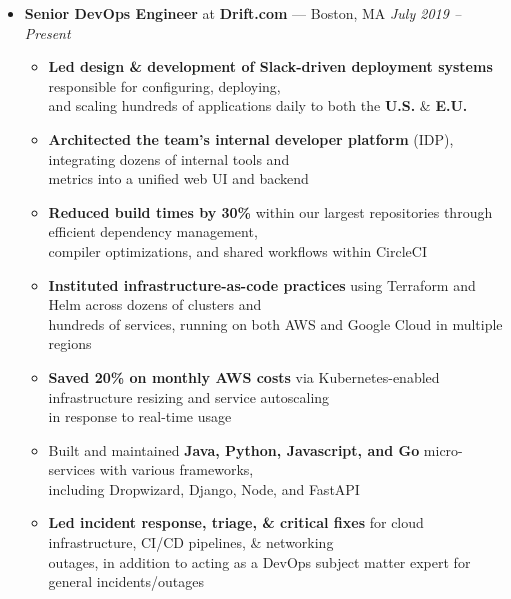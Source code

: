 \documentclass{article}
\begin{document}
\begin{itemize}[label={},leftmargin=*]
  \item \textbf{Senior DevOps Engineer} at \textbf{Drift.com} --- Boston, MA \hfill {\em July 2019 -- Present}
  \begin{itemize}[label={$\bullet$}]
    \item \textbf{Led design \& development of Slack-driven deployment systems} responsible for configuring, deploying,\\
          and scaling hundreds of applications daily to both the \textbf{U.S.} \& \textbf{E.U.}
    \item \textbf{Architected the team's internal developer platform} (IDP), integrating dozens of internal tools and\\
          metrics into a unified web UI and backend
    \item \textbf{Reduced build times by 30\%} within our largest repositories through efficient dependency management,\\
          compiler optimizations, and shared workflows within CircleCI
    \item \textbf{Instituted infrastructure-as-code practices} using Terraform and Helm across dozens of clusters and\\
          hundreds of services, running on both AWS and Google Cloud in multiple regions
    \item \textbf{Saved 20\% on monthly AWS costs} via Kubernetes-enabled infrastructure resizing and service autoscaling\\
          in response to real-time usage
    \item Built and maintained \textbf{Java, Python, Javascript, and Go} micro-services with various frameworks,\\ 
          including Dropwizard, Django, Node, and FastAPI
    \item \textbf{Led incident response, triage, \& critical fixes} for cloud infrastructure, CI/CD pipelines, \& networking\\
          outages, in addition to acting as a DevOps subject matter expert for general incidents/outages

  \end{itemize}


\end{itemize}
\end{document}

